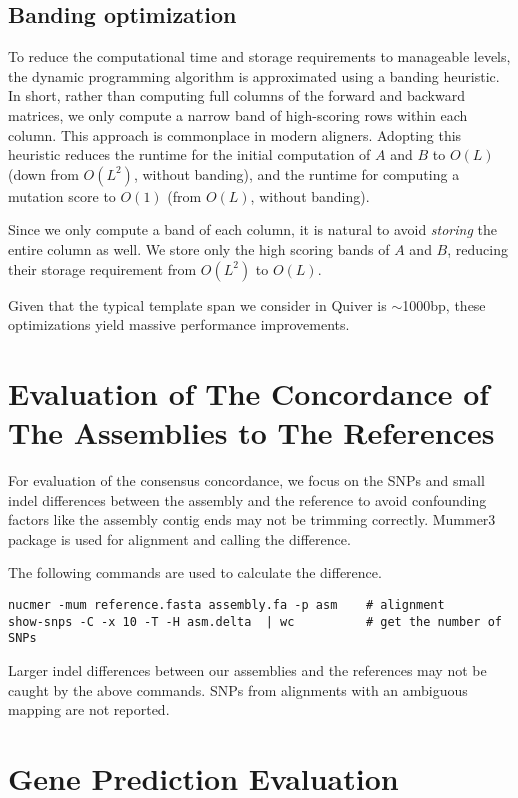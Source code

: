 \documentclass[11pt]{article}
\begin{document}
\subsection{Banding optimization}
To reduce the computational time and storage requirements to manageable levels, the dynamic programming algorithm is approximated using a banding heuristic.  In short, rather than computing full columns of the forward and backward matrices, we only compute a narrow band of high-scoring rows within each column.  This approach is commonplace in modern aligners.  Adopting this heuristic reduces the runtime for the initial computation of $A$ and $B$ to $O(L)$ (down from $O(L^2)$, without banding), and the runtime for computing a mutation score to $O(1)$ (from $O(L)$, without banding).

Since we only compute a band of each column, it is natural to avoid \emph{storing} the entire column as well.  We store only the high scoring bands of $A$ and $B$, reducing their storage requirement from $O(L^2)$ to $O(L)$.

Given that the typical template span we consider in Quiver is $\sim$1000bp, these optimizations yield massive performance improvements.  

\section{Evaluation of The Concordance of The Assemblies to The References}

For evaluation of the consensus concordance, we focus on the SNPs and small indel differences between the assembly and the reference to avoid confounding factors like the assembly contig ends may not be trimming correctly. Mummer3 package\cite{Kurtz14759262} is used for alignment and calling the difference.

The following commands are used to calculate the difference. 
 
\begin{verbatim}
nucmer -mum reference.fasta assembly.fa -p asm    # alignment
show-snps -C -x 10 -T -H asm.delta  | wc          # get the number of SNPs
\end{verbatim}

Larger indel differences between our assemblies and the references may not be caught by the above commands. SNPs from alignments with an ambiguous mapping are not reported.

\section{Gene Prediction Evaluation}
\end{document}
